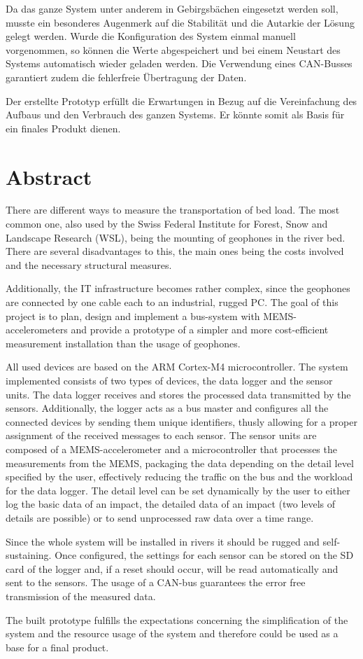 Da das ganze System unter anderem in Gebirgsbächen eingesetzt werden soll, musste ein besonderes Augenmerk auf die Stabilität und die Autarkie der Lösung gelegt werden. Wurde die Konfiguration des System einmal manuell vorgenommen, so können die Werte abgespeichert und bei einem Neustart des Systems automatisch wieder geladen werden. Die Verwendung eines CAN-Busses garantiert zudem die fehlerfreie Übertragung der Daten. 

Der erstellte Prototyp erfüllt die Erwartungen in Bezug auf die Vereinfachung des Aufbaus und den Verbrauch des ganzen Systems. Er könnte somit als Basis für ein finales Produkt dienen.



\newpage
\thispagestyle{empty}
\chapter*{Abstract}\label{abstract}
There are different ways to measure the transportation of bed load. The most common one, also used by the Swiss Federal Institute for Forest, Snow and Landscape Research (WSL), being the mounting of geophones in the river bed. There are several disadvantages to this, the main ones being the costs involved and the necessary structural measures. 

Additionally, the IT infrastructure becomes rather complex, since the geophones are connected by one cable each to an industrial, rugged PC. The goal of this project is to plan, design and implement a bus-system with MEMS-accelerometers and provide a prototype of a simpler and more cost-efficient measurement installation than the usage of geophones.

All used devices are based on the ARM Cortex-M4 microcontroller. The system implemented consists of two types of devices, the data logger and the sensor units. The data logger  receives and stores the processed data transmitted by the sensors. Additionally, the logger acts as a bus master and configures all the connected devices by sending them unique identifiers, thusly allowing for a proper assignment of the received messages to each sensor. The sensor units are composed of a MEMS-accelerometer and a microcontroller that processes the measurements from the MEMS, packaging the data depending on the detail level specified by the user, effectively reducing the traffic on the bus and the workload for the data logger. The detail level can be set dynamically by the user to either log the basic data of an impact, the detailed data of an impact (two levels of details are possible) or to send unprocessed raw data over a time range.

Since the whole system will be installed in rivers it should be rugged and self-sustaining. Once configured, the settings for each sensor can be stored on the SD card of the logger and, if a reset should occur, will be read automatically and sent to the sensors. The usage of a CAN-bus guarantees the error free transmission of the measured data.

The built prototype fulfills the expectations concerning the simplification of the system and the resource usage of the system and therefore could be used as a base for a final product.



